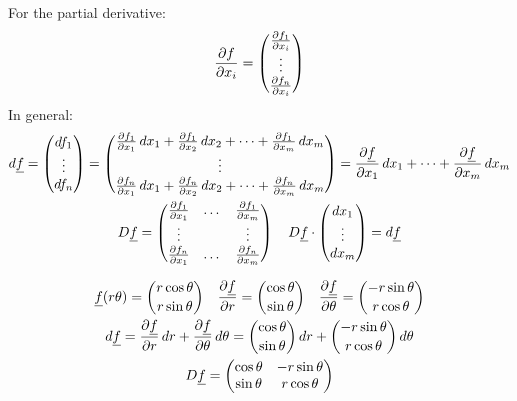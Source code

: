\begin{definition}[Derivative]
    For the partial derivative:
    \begin{gather*}
        \pdv{f}{x_i} = \begin{pmatrix}
            \pdv{f_1}{x_i} \\ \vdots \\ \pdv{f_n}{x_i}
        \end{pmatrix}
    \end{gather*}
    In general:
    \begin{gather*}
        \dd{\underline f}=\begin{pmatrix}
            \dd{f_1} \\ \vdots \\ \dd{f_n}
        \end{pmatrix} = \begin{pmatrix}
            \pdv{f_1}{x_1}\dd{x_1} +  \pdv{f_1}{x_2}\dd{x_2} +\dots+
            \pdv{f_1}{x_m}\dd{x_m} \\
            \vdots \\
            \pdv{f_n}{x_1}\dd{x_1} +  \pdv{f_n}{x_2}\dd{x_2} +\dots+
            \pdv{f_n}{x_m}\dd{x_m} \\
        \end{pmatrix} = \pdv{\underline f}{x_1}\dd{x_1}+\dots+\pdv{\underline
        f}{x_m}\dd{x_m} \\
    D\underline f = \begin{pmatrix}
    \pdv{f_1}{x_1}&\dots&\pdv{f_1}{x_m} \\
    \vdots && \vdots \\
    \pdv{f_n}{x_1}&\dots&\pdv{f_n}{x_m}
    \end{pmatrix} \quad
    D \underline f \cdot \begin{pmatrix}
    \dd{x_1} \\ \vdots \\ \dd{x_m}
    \end{pmatrix} = \dd{\underline f}
    \end{gather*}
\end{definition}
\begin{example}
    \begin{gather*}
        \underline f (r \theta)= \binom{r \cos \theta}{r \sin \theta} \quad
        \pdv{\underline f}{r} = \binom{\cos \theta}{\sin \theta} \quad
        \pdv{\underline f}{\theta}=\binom{-r\sin \theta}{r \cos \theta} \\
        \dd{\underline f} =\pdv{\underline f}{r}\dd{r}+\pdv{\underline
        f}{\theta}\dd{\theta} =
        \binom{\cos \theta}{\sin \theta}\dd{r}+
        \binom{-r\sin \theta}{r\cos \theta}\dd{\theta} \\
        D\underline f= \begin{pmatrix}
            \cos \theta & -r\sin \theta \\
            \sin \theta & r \cos \theta
        \end{pmatrix} \\
    \end{gather*}
\end{example}
